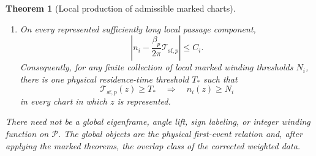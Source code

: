 \documentclass[11pt]{amsart}
\numberwithin{equation}{section}
\newtheorem{theorem}{Theorem}[section]
\theoremstyle{definition}
\theoremstyle{remark}
\begin{document}
\begin{theorem}[Local production of admissible marked charts]
\begin{enumerate}
\item On every represented sufficiently long local passage component,
\begin{equation}\label{eq:chart-production-time-winding}
 \left|n_i-\frac{\beta_p}{2\pi}
       \mathcal T_{\mathrm{sf},p}\right|\le C_i.
\end{equation}
Consequently, for any finite collection of local marked winding
thresholds $N_i$, there is one physical residence-time threshold $T_*$
such that
\begin{equation}\label{eq:physical-tail-implies-local-tail}
 \mathcal T_{\mathrm{sf},p}(z)\ge T_*
 \quad\Longrightarrow\quad n_i(z)\ge N_i
\end{equation}
in every chart in which $z$ is represented.
\end{enumerate}
There need not be a global eigenframe, angle lift, sign labeling, or
integer winding function on $\mathcal P$.  The global objects are the
physical first-event relation and, after applying the marked theorems, the
overlap class of the corrected weighted data.
\end{theorem}
\end{document}
